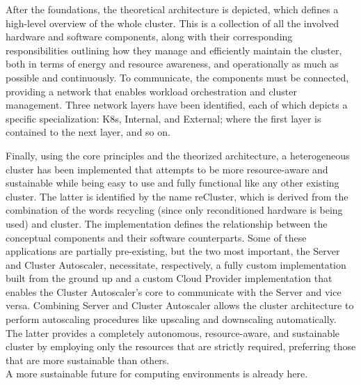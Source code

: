 After the foundations, the theoretical architecture is depicted, which defines a
high-level overview of the whole cluster. This is a collection of all the involved
hardware and software components, along with their corresponding
responsibilities outlining how they manage and efficiently maintain the cluster,
both in terms of energy and resource awareness, and operationally as much as
possible and continuously. To communicate, the components must be connected, providing
a network that enables workload orchestration and cluster management. Three
network layers have been identified, each of which depicts a specific specialization:
K8s, Internal, and External; where the first layer is contained to the next layer,
and so on.

Finally, using the core principles and the theorized architecture, a
heterogeneous cluster has been implemented that attempts to be more resource-aware
and sustainable while being easy to use and fully functional like any other
existing cluster. The latter is identified by the name reCluster, which is
derived from the combination of the words recycling (since only reconditioned hardware
is being used) and cluster. The implementation defines the relationship between the
conceptual components and their software counterparts. Some of these
applications are partially pre-existing, but the two most important, the Server
and Cluster Autoscaler, necessitate, respectively, a fully custom implementation
built from the ground up and a custom Cloud Provider implementation that enables
the Cluster Autoscaler's core to communicate with the Server and vice versa.
Combining Server and Cluster Autoscaler allows the cluster architecture to
perform autoscaling procedures like upscaling and downscaling automatically. The
latter provides a completely autonomous, resource-aware, and sustainable cluster
by employing only the resources that are strictly required, preferring those
that are more sustainable than others. \\ %

A more sustainable future for computing environments is already here.